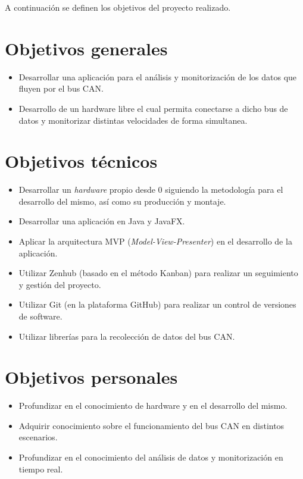 
A continuación se definen los objetivos del proyecto realizado.


\section{Objetivos generales}\label{objetivos-generales}

\begin{itemize}
\tightlist
\item
  Desarrollar una aplicación para el análisis y monitorización de  los datos que fluyen por el bus CAN.
\item
  Desarrollo de un hardware libre el cual permita conectarse a dicho bus de datos y monitorizar distintas velocidades de forma simultanea.
  
\end{itemize}

\section{Objetivos técnicos}\label{objetivos-tecnicos}

\begin{itemize}
\tightlist
\item
  Desarrollar un \emph{hardware} propio desde 0 siguiendo la metodología para el desarrollo del mismo, así como su producción y montaje.
\item
  Desarrollar una aplicación en Java y JavaFX.
\item
  Aplicar la arquitectura MVP (\emph{Model-View-Presenter}) en el
  desarrollo de la aplicación.
\item
  Utilizar Zenhub (basado en el método Kanban) para realizar un seguimiento y gestión del proyecto.
\item
  Utilizar Git (en la plataforma GitHub) para realizar un control de versiones de software.
\item
  Utilizar librerías para la recolección de datos del bus CAN.
\end{itemize}

\section{Objetivos personales}\label{objetivos-personales}

\begin{itemize}
\tightlist
\item
  Profundizar en el conocimiento de hardware y en el desarrollo del mismo.
\item
  Adquirir conocimiento sobre el funcionamiento del bus CAN en distintos escenarios.
\item
  Profundizar en el conocimiento del análisis de datos y monitorización en tiempo real.

\end{itemize}
